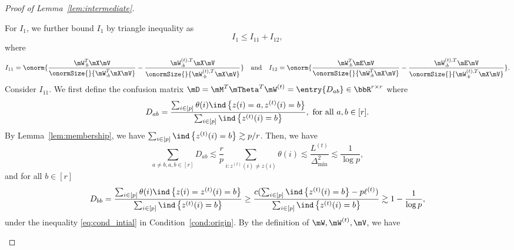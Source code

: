 \documentclass[lettersize,onecolumn,journal]{IEEEtran}
\theoremstyle{definition}
\theoremstyle{definition}
\newcommand{\of}[1]{\left(#1\right)}
\newcommand{\offf}[1]{\left\{#1\right\}}
\begin{document}
\begin{proof}[Proof of Lemma~\ref{lem:intermediate}]
\begin{enumerate}
    For $I_1$, we further bound $I_1$ by triangle inequality as
    \begin{equation}
        I_1 \leq I_{11} + I_{12},
    \end{equation}
    where
     \begin{equation}
        I_{11} = \onorm{ \frac{ \mW_{:b}^T \mX \mV  }{\onormSize{}{  \mW_{:b}^T \mX \mV }} - \frac{ \mW_{:b}^{(t), T} \mX \mV  }{ \onormSize{}{\mW_{:b}^{(t), T} \mX \mV }}   } \quad \text{and} \quad I_{12} = \onorm{ \frac{\mW_{:b}^T \mE \mV}{ \onormSize{}{  \mW_{:b}^T \mX \mV }} - \frac{\mW_{:b}^{(t),T} \mE \mV}{ \onormSize{}{  \mW_{:b}^{(t),T} \mX \mV }} }.
    \end{equation}
    Consider $I_{11}$. We first define the confusion matrix $\mD = \mM^T \mTheta^T \mW^{(t)} = \entry{D_{ab}} \in \bbR^{r \times r}$ where 
    \begin{equation}
        D_{ab} = \frac{\sum_{i \in [p]}  \theta(i) \ind \offf{ z(i) = a, z^{(t)}(i) = b } }{\sum_{i \in [p]}  \ind\offf{  z^{(t)}(i) = b }}, \text{  for all } a, b \in [r].
    \end{equation}
    By Lemma~\ref{lem:membership},  we have $\sum_{i \in [p]}  \ind\offf{  z^{(t)}(i) = b } \gtrsim p/r$. Then, we have
    \begin{equation}\label{eq:dab_bound}
        \sum_{a \neq b, a,b \in [r]} D_{ab} \lesssim \frac{r}{p} \sum_{i \colon z^{(t)}(i) \neq z(i)} \theta(i) \lesssim\frac{L^{(t)}}{\Delta_{\min}^2}  \lesssim \frac{1}{\log p}, 
    \end{equation}
    and for all $b \in [r]$
    \begin{equation}\label{eq:dbb_bound}
        D_{bb} = \frac{\sum_{i \in [p]}  \theta(i) \ind \offf{ z(i) = z^{(t)}(i) = b } }{\sum_{i \in [p]}  \ind\offf{  z^{(t)}(i) = b }} \geq \frac{c(\sum_{i \in [p]}  \ind\offf{  z^{(t)}(i) = b } - p\ell^{(t)})}{\sum_{i \in [p]}  \ind\offf{  z^{(t)}(i) = b }} \gtrsim 1 - \frac{1}{\log p},
    \end{equation}
    under the inequality \eqref{eq:cond_intial} in Condition~\ref{cond:origin}. By the definition of $\mW,\mW^{(t)},\mV$, we have 

\end{enumerate}
\end{proof}
\end{document}
